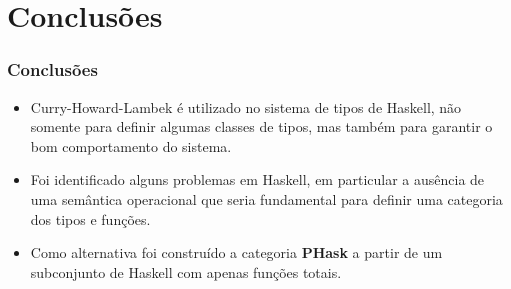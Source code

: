 \documentclass{beamer}
\begin{document}
  \section{Conclus\~oes}
  \begin{frame}
    \frametitle{Conclus\~oes}
    \begin{itemize}
      \item Curry-Howard-Lambek \'e utilizado no sistema de tipos de Haskell, n\~ao somente para definir
        algumas classes de tipos, mas tamb\'em para garantir o bom comportamento do sistema.
      \item Foi identificado alguns problemas em Haskell, em particular a aus\^encia de uma sem\^antica operacional 
        que seria fundamental para definir uma categoria dos tipos e fun\c{c}\~oes.
      \item Como alternativa foi constru\'ido a categoria \textbf{PHask} a partir de um subconjunto
        de Haskell com apenas fun\c{c}\~oes totais.
    \end{itemize}
  \end{frame}
\end{document}
